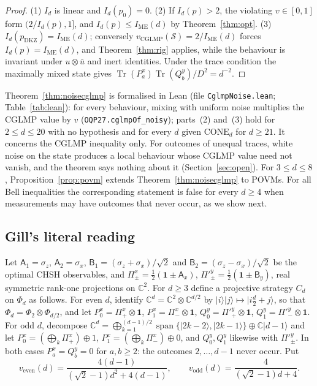 \documentclass[11pt]{article}
\theoremstyle{remark}
\numberwithin{equation}{section}
\newcommand{\C}{\mathbb{C}}
\newcommand{\Tr}{\operatorname{Tr}}
\newcommand{\IME}{I_{\mathrm{ME}}}
\newcommand{\one}{\mathbf{1}}
\newcommand{\veven}{v_{\mathrm{even}}}
\newcommand{\vodd}{v_{\mathrm{odd}}}
\newcommand{\DKZ}{\mathrm{DKZ}}
\newcommand{\CONE}{\mathrm{CONE}}
\newcommand{\sA}{\mathsf{A}}
\newcommand{\sB}{\mathsf{B}}
\begin{document}
\begin{proof}
(1) $I_d$ is linear and $I_d(p_0)=0$. (2) If $I_d(p)>2$, the violating $v\in[0,1]$ form $(2/I_d(p),1]$, and
$I_d(p)\le\IME(d)$ by Theorem~\ref{thm:opt}. (3) $I_d(p_{\DKZ})=\IME(d)$; conversely
$v_{\mathrm{CGLMP}}(\mathcal S)=2/\IME(d)$ forces $I_d(p)=\IME(d)$, and Theorem~\ref{thm:rig} applies, while the behaviour
is invariant under $u\otimes\bar u$ and inert identities. Under the trace condition the maximally mixed state gives
$\Tr(P^x_a)\Tr(Q^y_b)/D^2=d^{-2}$.
\end{proof}

Theorem~\ref{thm:noisecglmp} is formalised in Lean (file \texttt{CglmpNoise.lean}; Table~\ref{tab:lean}): for every
behaviour, mixing with uniform noise multiplies the CGLMP value by $v$ (\nolinkurl{OQP27.cglmpOf_noisy}); parts~(2)
and~(3) hold for $2\le d\le20$ with no hypothesis and for every $d$ given $\CONE_d$ for $d\ge21$. It concerns the CGLMP
inequality only. For outcomes of unequal traces, white noise on the state produces a local behaviour whose CGLMP value
need not vanish, and the theorem says nothing about it (Section~\ref{sec:open}). For $3\le d\le8$,
Proposition~\ref{prop:povm} extends Theorem~\ref{thm:noisecglmp} to POVMs. For all Bell inequalities the corresponding
statement is false for every $d\ge4$ when measurements may have outcomes that never occur, as we show next.

\subsection{Gill's literal reading}\label{subsec:literal}
Let $\sA_1=\sigma_z$, $\sA_2=\sigma_x$, $\sB_1=(\sigma_z+\sigma_x)/\sqrt2$ and $\sB_2=(\sigma_z-\sigma_x)/\sqrt2$ be the
optimal CHSH observables, and $\Pi^x_\pm=\frac12(\one\pm\sA_x)$, $\Pi'^y_\pm=\frac12(\one\pm\sB_y)$, real symmetric
rank-one projections on $\C^2$. For $d\ge3$ define a projective strategy $C_d$ on $\Phi_d$ as follows. For even $d$,
identify $\C^d=\C^2\otimes\C^{d/2}$ by $|i\rangle|j\rangle\mapsto|i\frac d2+j\rangle$, so that $\Phi_d=\Phi_2\otimes\Phi_{d/2}$,
and let $P^x_0=\Pi^x_+\otimes\one$, $P^x_1=\Pi^x_-\otimes\one$, $Q^y_0=\Pi'^y_+\otimes\one$, $Q^y_1=\Pi'^y_-\otimes\one$.
For odd $d$, decompose $\C^d=\bigoplus_{k=1}^{(d-1)/2}\operatorname{span}\{|2k-2\rangle,|2k-1\rangle\}\oplus\C|d-1\rangle$
and let $P^x_0=(\bigoplus_k\Pi^x_+)\oplus1$, $P^x_1=(\bigoplus_k\Pi^x_-)\oplus0$, and $Q^y_0,Q^y_1$ likewise with
$\Pi'^y_\pm$. In both cases $P^x_a=Q^y_b=0$ for $a,b\ge2$: the outcomes $2,\dots,d-1$ never occur. Put
\begin{equation}\label{eq:vevenodd}
\veven(d)=\frac{4(d-1)}{(\sqrt2-1)d^2+4(d-1)},\qquad\vodd(d)=\frac4{(\sqrt2-1)d+4}.
\end{equation}
\end{document}
